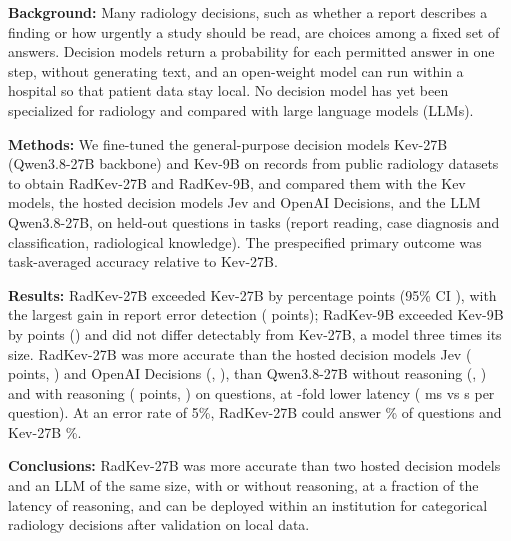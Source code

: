 \setlength{\parskip}{6pt}

\noindent\textbf{Background:} Many radiology decisions, such as whether a report describes a finding or how urgently a study should be read, are choices among a fixed set of answers. Decision models return a probability for each permitted answer in one step, without generating text, and an open-weight model can run within a hospital so that patient data stay local. No decision model has yet been specialized for radiology and compared with large language models (LLMs).

\noindent\textbf{Methods:} We fine-tuned the general-purpose decision models Kev-27B (Qwen3.8-27B backbone) and Kev-9B on  records from public radiology datasets to obtain RadKev-27B and RadKev-9B, and compared them with the Kev models, the hosted decision models Jev and OpenAI Decisions, and the LLM Qwen3.8-27B, on  held-out questions in  tasks (report reading, case diagnosis and classification, radiological knowledge). The prespecified primary outcome was task-averaged accuracy relative to Kev-27B.

\noindent\textbf{Results:} RadKev-27B exceeded Kev-27B by  percentage points (95\% CI ), with the largest gain in report error detection ( points); RadKev-9B exceeded Kev-9B by  points () and did not differ detectably from Kev-27B, a model three times its size. RadKev-27B was more accurate than the hosted decision models Jev ( points, ) and OpenAI Decisions (, ), than Qwen3.8-27B without reasoning (, ) and with reasoning ( points, ) on  questions, at -fold lower latency ( ms vs  s per question). At an error rate of 5\%, RadKev-27B could answer \% of questions and Kev-27B \%. %

\noindent\textbf{Conclusions:} RadKev-27B was more accurate than two hosted decision models and an LLM of the same size, with or without reasoning, at a fraction of the latency of reasoning, and can be deployed within an institution for categorical radiology decisions after validation on local data. %

